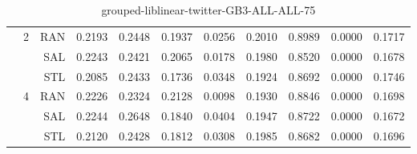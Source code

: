 \begin{center}
\begin{table}[htbp]
\begin{tabular}{ | r | r | r | r | r | r | r | r | r | r | r |}
 & \multirow{3}{*}{2} & RAN & 0.2193 & 0.2448 & 0.1937 & 0.0256 & 0.2010 & 0.8989 & 0.0000 & 0.1717\\ \cline{3-11}
 &   & SAL & 0.2243 & 0.2421 & 0.2065 & 0.0178 & 0.1980 & 0.8520 & 0.0000 & 0.1678\\ \cline{3-11}
 &   & STL & 0.2085 & 0.2433 & 0.1736 & 0.0348 & 0.1924 & 0.8692 & 0.0000 & 0.1746\\ \cline{2-11}
 & \multirow{3}{*}{4} & RAN & 0.2226 & 0.2324 & 0.2128 & 0.0098 & 0.1930 & 0.8846 & 0.0000 & 0.1698\\ \cline{3-11}
 &   & SAL & 0.2244 & 0.2648 & 0.1840 & 0.0404 & 0.1947 & 0.8722 & 0.0000 & 0.1672\\ \cline{3-11}
 &   & STL & 0.2120 & 0.2428 & 0.1812 & 0.0308 & 0.1985 & 0.8682 & 0.0000 & 0.1696\\ \cline{2-11}
\hline
\end{tabular}
\caption{grouped-liblinear-twitter-GB3-ALL-ALL-75}
\end{table}
\end{center}

